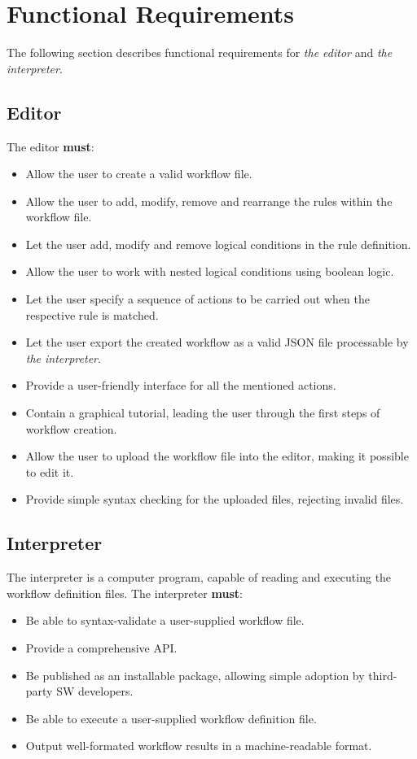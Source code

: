\section{Functional Requirements}
\label{requirements}

The following section describes functional requirements for \textit{the editor} and \textit{the interpreter}. 

\subsection{Editor}

The editor \textbf{must}:
\begin{itemize}
    \item Allow the user to create a valid workflow file.
    \item Allow the user to add, modify, remove and rearrange the rules within the workflow file.
    \item Let the user add, modify and remove logical conditions in the rule definition.
    \item Allow the user to work with nested logical conditions using boolean logic.
    \item Let the user specify a sequence of actions to be carried out when the respective rule is matched.
    \item Let the user export the created workflow as a valid JSON file processable by \textit{the interpreter}.
    \item Provide a user-friendly interface for all the mentioned actions.
    \item Contain a graphical tutorial, leading the user through the first steps of workflow creation.
    \item Allow the user to upload the workflow file into the editor, making it possible to edit it.
    \item Provide simple syntax checking for the uploaded files, rejecting invalid files.
\end{itemize}

\subsection{Interpreter}

The interpreter is a computer program, capable of reading and executing the workflow definition files.
The interpreter \textbf{must}:
\begin{itemize}
    \item Be able to syntax-validate a user-supplied workflow file.
    \item Provide a comprehensive API.
    \item Be published as an installable package, allowing simple adoption by third-party \acs{SW} developers.
    \item Be able to execute a user-supplied workflow definition file.
    \item Output well-formated workflow results in a machine-readable format.
\end{itemize}